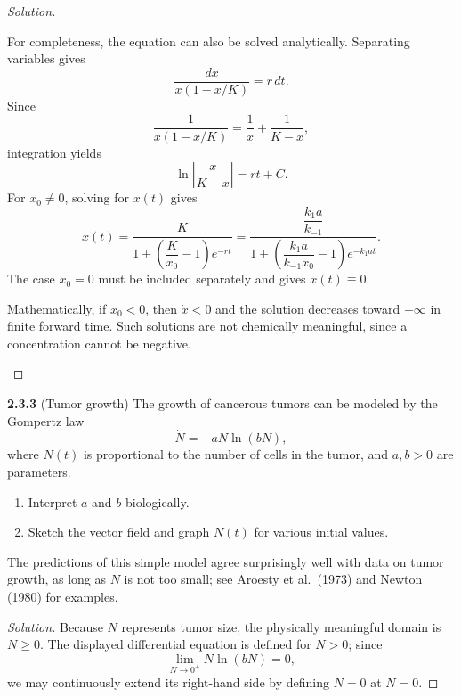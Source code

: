 \documentclass[10pt]{amsart}
\newenvironment{solution}
{\begin{proof}[Solution]}
{\end{proof}}
\begin{document}
\begin{onehalfspace}
\begin{solution}
\begin{enumerate}[label=\alph*)]
                For completeness, the equation can also be solved analytically. Separating
                variables gives
                \[
                    \frac{dx}{x(1-x/K)}=r\,dt.
                \]
                Since
                \[
                    \frac{1}{x(1-x/K)}=\frac1x+\frac{1}{K-x},
                \]
                integration yields
                \[
                    \ln\left|\frac{x}{K-x}\right|=rt+C.
                \]
                For $x_0\ne0$, solving for $x(t)$ gives
                \[
                    \boxed{
                        x(t)=\frac{K}{1+\left(\dfrac{K}{x_0}-1\right)e^{-rt}}
                        =\frac{\dfrac{k_1a}{k_{-1}}}
                        {1+\left(\dfrac{k_1a}{k_{-1}x_0}-1\right)e^{-k_1at}}.
                    }
                \]
                The case $x_0=0$ must be included separately and gives $x(t)\equiv0$.

                Mathematically, if $x_0<0$, then $\dot{x}<0$ and the solution decreases
                toward $-\infty$ in finite forward time. Such solutions are not chemically
                meaningful, since a concentration cannot be negative.
            \end{enumerate}
        \end{solution}

        \noindent\textbf{2.3.3} (Tumor growth)
        The growth of cancerous tumors can be modeled by the Gompertz law
        \[
            \dot{N}=-aN\ln(bN),
        \]
        where \(N(t)\) is proportional to the number of cells in the tumor,
        and \(a,b>0\) are parameters.

        \begin{enumerate}[label=\alph*)]
            \item Interpret \(a\) and \(b\) biologically.
            \item Sketch the vector field and graph \(N(t)\) for various
            initial values.
        \end{enumerate}

        The predictions of this simple model agree surprisingly well with
        data on tumor growth, as long as \(N\) is not too small; see
        Aroesty et al.\ (1973) and Newton (1980) for examples.

        \begin{solution}
            Because $N$ represents tumor size, the physically meaningful domain is
            $N\geq0$. The displayed differential equation is defined for $N>0$; since
            \[
                \lim_{N\to0^+}N\ln(bN)=0,
            \]
            we may continuously extend its right-hand side by defining $\dot N=0$ at
            $N=0$.


\end{solution}
\end{onehalfspace}
\end{document}
